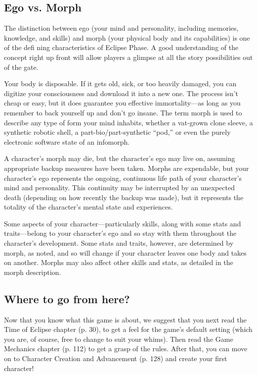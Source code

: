 \subsection{Ego vs. Morph} \label{sec:ego-vs.-morph} 

The distinction between ego (your mind and personality, including memories, knowledge, and skills) and morph (your physical body and its capabilities) is one of the defi ning characteristics of Eclipse Phase. A good understanding of the concept right up front will allow players a glimpse at all the story possibilities out of the gate. 

Your body is disposable. If it gets old, sick, or too heavily damaged, you can digitize your consciousness and download it into a new one. The process isn't cheap or easy, but it does guarantee you effective immortality—as long as you remember to back yourself up and don't go insane. The term morph is used to describe any type of form your mind inhabits, whether a vat-grown clone sleeve, a synthetic robotic shell, a part-bio/part-synthetic ``pod,'' or even the purely electronic software state of an infomorph. 

A character's morph may die, but the character's ego may live on, assuming appropriate backup measures have been taken. Morphs are expendable, but your character's ego represents the ongoing, continuous life path of your character's mind and personality. This continuity may be interrupted by an unexpected death (depending on how recently the backup was made), but it represents the totality of the character's mental state and experiences. 

Some aspects of your character—particularly skills, along with some stats and traits—belong to your character's ego and so stay with them throughout the character's development. Some stats and traits, however, are determined by morph, as noted, and so will change if your character leaves one body and takes on another. Morphs may also affect other skills and stats, as detailed in the morph description. 



\subsection{Where to go from here?} \label{sec:where-go-from} 

Now that you know what this game is about, we suggest that you next read the Time of Eclipse chapter (p. 30), to get a feel for the game's default setting (which you are, of course, free to change to suit your whims). Then read the Game Mechanics chapter (p. 112) to get a grasp of the rules. After that, you can move on to Character Creation and Advancement (p. 128) and create your first character! 



